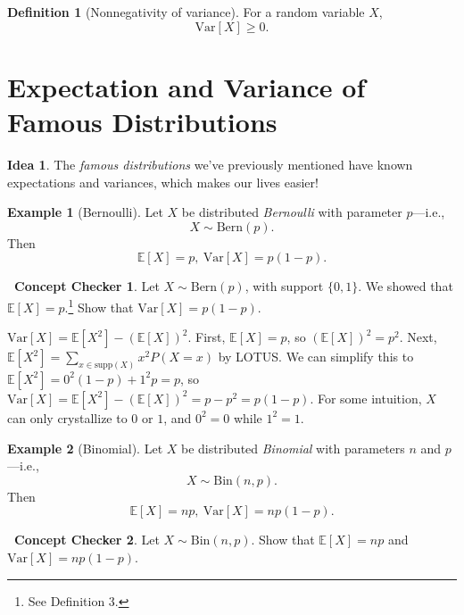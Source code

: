 \documentclass[12pt,oneside]{article}
\newcommand{\E}{\mathbb{E}}
\newcommand{\Var}{\text{Var}}
\newcommand{\supp}{\text{supp}}
\newcommand{\Bern}{\text{Bern}}
\newcommand{\Bin}{\text{Bin}}
\theoremstyle{definition}
\newtheorem{definition}{Definition}
\newtheorem{example}{Example}
\newtheorem{concept}{\faPen \ Concept Checker}
\newtheorem*{idea}{Idea}
\theoremstyle{remark}
\begin{document}
\begin{definition}[Nonnegativity of variance]
For a random variable $X$, \[\Var[X] \geq 0.\]
\end{definition}

\section{Expectation and Variance of Famous Distributions}

\begin{idea}
The \textit{famous distributions} we've previously mentioned have known expectations and variances, which makes our lives easier! 
\end{idea}

\begin{example}[Bernoulli]
Let $X$ be distributed \textit{Bernoulli} with parameter $p$—i.e., \[X \sim \Bern(p).\] Then \[\E[X] = p, \ \Var[X] = p (1 - p).\]
\end{example}

\begin{concept}
Let $X \sim \Bern(p)$, with support $\{0, 1\}$. We showed that $\E[X] = p$.\footnote{See Definition 3.} Show that $\Var[X] = p (1 - p)$.
\end{concept}

\begin{solutionbox}
$\Var[X] = \E[X^2] - (\E[X])^2$. First, $\E[X] = p$, so $(\E[X])^2 = p^2$. Next, $\E[X^2] = \sum_{x \in \supp(X)} x^2 P(X = x)$ by LOTUS. We can simplify this to $\E[X^2] = 0^2 (1 - p) + 1^2 p = p$, so $\Var[X] = \E[X^2] - (\E[X])^2 = p - p^2 = p (1 - p)$. For some intuition, $X$ can only crystallize to $0$ or $1$, and $0^2 = 0$ while $1^2 = 1$.
\end{solutionbox}

\begin{example}[Binomial]
Let $X$ be distributed \textit{Binomial} with parameters $n$ and $p$—i.e., \[X \sim \Bin(n, p).\] Then \[\E[X] = np, \ \Var[X] = n p (1 - p).\]
\end{example}

\begin{concept}
Let $X \sim \Bin(n, p)$. Show that $\E[X] = n p$ and $\Var[X] = n p (1 - p)$.
\end{concept}
\end{document}
